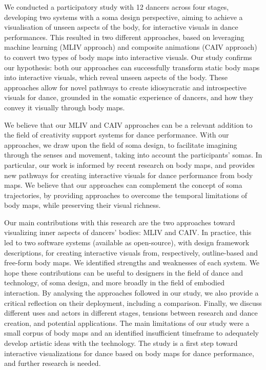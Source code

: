 We conducted a participatory study with 12 dancers across four stages, developing two systems with a soma design perspective, aiming to achieve a visualisation of unseen aspects of the body, for interactive visuals in dance performances. This resulted in two different approaches, based on leveraging machine learning (MLIV approach) and composite animations (CAIV approach) to convert two types of body maps into interactive visuals. Our study confirms our hypothesis: both our approaches can successfully transform static body maps into interactive visuals, which reveal unseen aspects of the body. These approaches allow for novel pathways to create idiosyncratic and introspective visuals for dance, grounded in the somatic experience of dancers, and how they convey it visually through body maps.

We believe that our MLIV and CAIV approaches can be a relevant addition to the field of creativity support systems for dance performance. With our approaches, we draw upon the field of soma design, to facilitate imagining through the senses and movement, taking into account the participants’ somas. In particular, our work is informed by recent research on body maps, and provides new pathways for creating interactive visuals for dance performance from body maps. We believe that our approaches can complement the concept of soma trajectories, by providing approaches to overcome the temporal limitations of body maps, while preserving their visual richness.

Our main contributions with this research are the two approaches toward visualizing inner aspects of dancers’ bodies: MLIV and CAIV. In practice, this led to two software systems (available as open-source), with design framework descriptions, for creating interactive visuals from, respectively, outline-based and free-form body maps. We identified strengths and weaknesses of each system. We hope these contributions can be useful to designers in the field of dance and technology, of soma design, and more broadly in the field of embodied interaction. By analysing the approaches followed in our study, we also provide a critical reflection on their deployment, including a comparison. Finally, we discuss different uses and actors in different stages, tensions between research and dance creation, and potential applications. The main limitations of our study were a small corpus of body maps and an identified insufficient timeframe to adequately develop artistic ideas with the technology. The study is a first step toward interactive visualizations for dance based on body maps for dance performance, and further research is needed.

